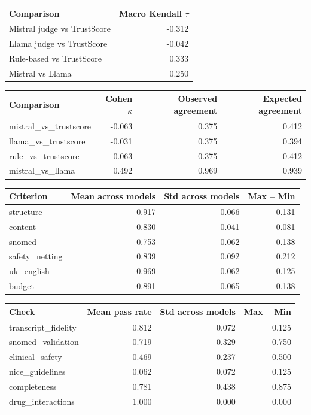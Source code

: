\begin{tabular}{lr}
\toprule
Comparison & Macro Kendall $\tau$ \\
\midrule
Mistral judge vs TrustScore & -0.312 \\
Llama judge vs TrustScore   & -0.042 \\
Rule-based vs TrustScore    & 0.333 \\
Mistral vs Llama            & 0.250 \\
\bottomrule
\end{tabular}

\begin{tabular}{lrrr}
\toprule
Comparison & Cohen $\kappa$ & Observed agreement & Expected agreement \\
\midrule
mistral\_vs\_trustscore & -0.063 & 0.375 & 0.412 \\
llama\_vs\_trustscore & -0.031 & 0.375 & 0.394 \\
rule\_vs\_trustscore & -0.063 & 0.375 & 0.412 \\
mistral\_vs\_llama & 0.492 & 0.969 & 0.939 \\
\bottomrule
\end{tabular}

\begin{tabular}{lrrr}
\toprule
Criterion & Mean across models & Std across models & Max -- Min \\
\midrule
structure & 0.917 & 0.066 & 0.131 \\
content & 0.830 & 0.041 & 0.081 \\
snomed & 0.753 & 0.062 & 0.138 \\
safety\_netting & 0.839 & 0.092 & 0.212 \\
uk\_english & 0.969 & 0.062 & 0.125 \\
budget & 0.891 & 0.065 & 0.138 \\
\bottomrule
\end{tabular}

\begin{tabular}{lrrr}
\toprule
Check & Mean pass rate & Std across models & Max -- Min \\
\midrule
transcript\_fidelity & 0.812 & 0.072 & 0.125 \\
snomed\_validation & 0.719 & 0.329 & 0.750 \\
clinical\_safety & 0.469 & 0.237 & 0.500 \\
nice\_guidelines & 0.062 & 0.072 & 0.125 \\
completeness & 0.781 & 0.438 & 0.875 \\
drug\_interactions & 1.000 & 0.000 & 0.000 \\
\bottomrule
\end{tabular}
